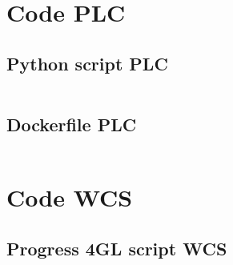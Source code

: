 
\section{Code PLC}\label{sec:codeplc}

\subsection{Python script PLC}
\inputminted{python3}{../tests/plc/plc-simulator.py}

\subsection{Dockerfile PLC}
\inputminted{python3}{../tests/plc/Dockerfile}


\section{Code WCS}\label{sec:codewcs}

\subsection{Progress 4GL script WCS}
\inputminted{python3}{../tests/wcs/wcs.p}
